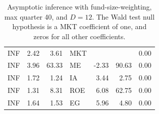 \documentclass[12pt]{article}
\begin{document}
\begin{table}[ht]
\begin{tabular}{lrrlrrr}
		\hline
		INF & 2.42 & 3.61 & MKT &  &  & 0.00 \\ 
		INF & 3.96 & 63.33 & ME & -2.33 & 90.63 & 0.00 \\ 
		INF & 1.72 & 1.24 & IA & 3.44 & 2.75 & 0.00 \\ 
		INF & 1.31 & 8.31 & ROE & 6.08 & 62.75 & 0.00 \\ 
		INF & 1.64 & 1.53 & EG & 5.96 & 4.80 & 0.00 \\ 
		\hline
		\hline
	\end{tabular}
	\caption{Asymptotic inference with fund-size-weighting, max quarter 40, and $D=12$. The Wald test null hypothesis is a MKT coefficient of one, and zeros for all other coefficients.}
	\label{tab:ai_40_fw_dep}
\end{table}


\end{document}

